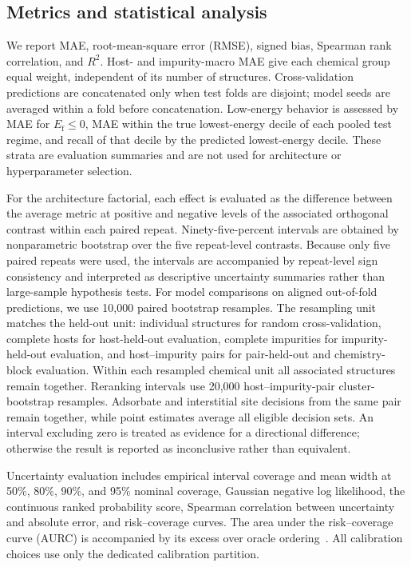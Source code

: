 
\subsection{Metrics and statistical analysis}
\label{sec:evaluation}

We report MAE, root-mean-square error (RMSE), signed bias, Spearman rank
correlation, and $R^2$.  Host- and impurity-macro MAE give each chemical group
equal weight, independent of its number of structures.  Cross-validation
predictions are concatenated only when test folds are disjoint; model seeds
are averaged within a fold before concatenation.  Low-energy behavior is
assessed by MAE for $E_{\mathrm f}\leq 0$, MAE within the true lowest-energy
decile of each pooled test regime, and recall of that decile by the predicted
lowest-energy decile.  These strata are evaluation summaries and are not used
for architecture or hyperparameter selection.

For the architecture factorial, each effect is evaluated as the difference
between the average metric at positive and negative levels of the associated
orthogonal contrast within each paired repeat.  Ninety-five-percent intervals
are obtained by nonparametric bootstrap over the five repeat-level contrasts.
Because only five paired repeats were used, the intervals are
accompanied by repeat-level sign consistency and interpreted as descriptive
uncertainty summaries rather than large-sample hypothesis tests.
For model comparisons on aligned out-of-fold predictions, we use 10,000 paired
bootstrap resamples.  The resampling unit matches the held-out unit: individual
structures for random cross-validation, complete hosts for host-held-out
evaluation, complete impurities for impurity-held-out evaluation, and
host--impurity pairs for pair-held-out and chemistry-block evaluation.
Within each resampled chemical unit all associated structures remain together.
Reranking intervals use 20,000 host--impurity-pair cluster-bootstrap
resamples.  Adsorbate and interstitial site decisions from the same pair remain
together, while point estimates average all eligible decision sets.
An interval excluding zero is treated as evidence for a directional difference;
otherwise the result is reported as inconclusive rather than equivalent.

Uncertainty evaluation includes empirical interval coverage and mean width at
50\%, 80\%, 90\%, and 95\% nominal coverage, Gaussian negative log likelihood,
the continuous ranked probability score, Spearman correlation between
uncertainty and absolute error, and risk--coverage curves.  The area under the
risk--coverage curve (AURC) is accompanied by its excess over oracle
ordering~\cite{elyaniv2010}.
All calibration choices use only the dedicated calibration partition.

